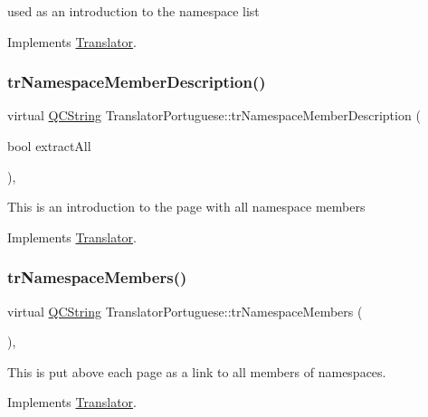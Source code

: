 used as an introduction to the namespace list 

Implements \mbox{\hyperlink{class_translator}{Translator}}.

\mbox{\label{class_translator_portuguese_adcd31f154058950cfc7035282f6599fb}} 
\subsubsection{\texorpdfstring{trNamespaceMemberDescription()}{trNamespaceMemberDescription()}}
{\footnotesize\ttfamily virtual \mbox{\hyperlink{class_q_c_string}{Q\+C\+String}} Translator\+Portuguese\+::tr\+Namespace\+Member\+Description (\begin{DoxyParamCaption}\item[{bool}]{extract\+All }\end{DoxyParamCaption})\hspace{0.3cm}{\ttfamily [inline]}, {\ttfamily [virtual]}}

This is an introduction to the page with all namespace members 

Implements \mbox{\hyperlink{class_translator}{Translator}}.

\mbox{\label{class_translator_portuguese_a9744a501cca3572f9c069c321abab9cf}} 
\subsubsection{\texorpdfstring{trNamespaceMembers()}{trNamespaceMembers()}}
{\footnotesize\ttfamily virtual \mbox{\hyperlink{class_q_c_string}{Q\+C\+String}} Translator\+Portuguese\+::tr\+Namespace\+Members (\begin{DoxyParamCaption}{ }\end{DoxyParamCaption})\hspace{0.3cm}{\ttfamily [inline]}, {\ttfamily [virtual]}}

This is put above each page as a link to all members of namespaces. 

Implements \mbox{\hyperlink{class_translator}{Translator}}.

